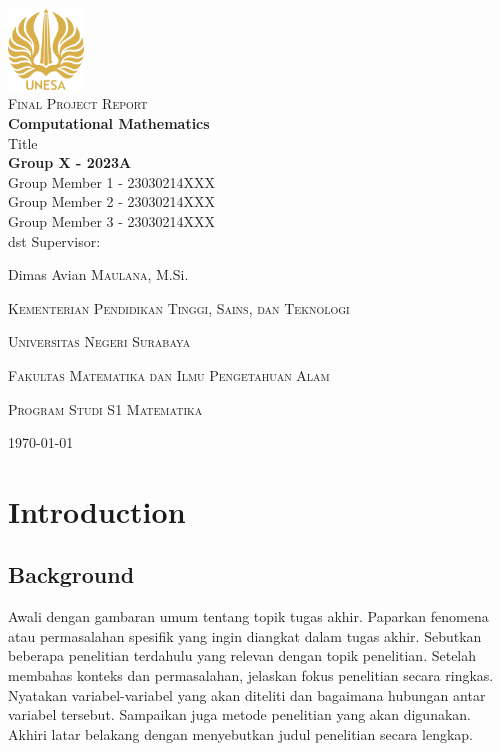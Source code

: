 \documentclass[english,12pt,a4paper]{book}
\begin{document}
	\begin{titlepage}
		\centering
		\includegraphics[width=0.15\textwidth]{logounesa.png}\\[2ex]
		{\Large \textsc{Final Project Report}}\\[2ex]
		{\LARGE\bfseries Computational Mathematics}\\[8ex]
		{\large Title}\\[7cm]
		\textbf{Group X - 2023A}\\[2ex]
			Group Member 1 - 23030214XXX\\
			Group Member 2 - 23030214XXX\\
			Group Member 3 - 23030214XXX\\
			dst
		\vfill
		Supervisor:\par
		Dimas Avian \textsc{Maulana}, M.Si.\\
	
		\vfill
		{\large\textsc{Kementerian Pendidikan Tinggi, Sains, dan Teknologi} \par}
		{\large\textsc{Universitas Negeri Surabaya} \par}
		{\large\textsc{Fakultas Matematika dan Ilmu Pengetahuan Alam} \par}
		{\large\textsc{Program Studi S1 Matematika} \par}
		\vspace{1cm}
		{\large \today\par}
	\end{titlepage}
	
	\tableofcontents
	
\chapter{Introduction}
\section{Background}
Awali dengan gambaran umum tentang topik tugas akhir. Paparkan fenomena atau permasalahan spesifik yang ingin diangkat dalam tugas akhir. Sebutkan beberapa penelitian terdahulu yang relevan dengan topik penelitian. Setelah membahas konteks dan permasalahan, jelaskan fokus penelitian secara ringkas. Nyatakan variabel-variabel yang akan diteliti dan bagaimana hubungan antar variabel tersebut. Sampaikan juga metode penelitian yang akan digunakan. Akhiri latar belakang dengan menyebutkan judul penelitian secara lengkap.
\end{document}
